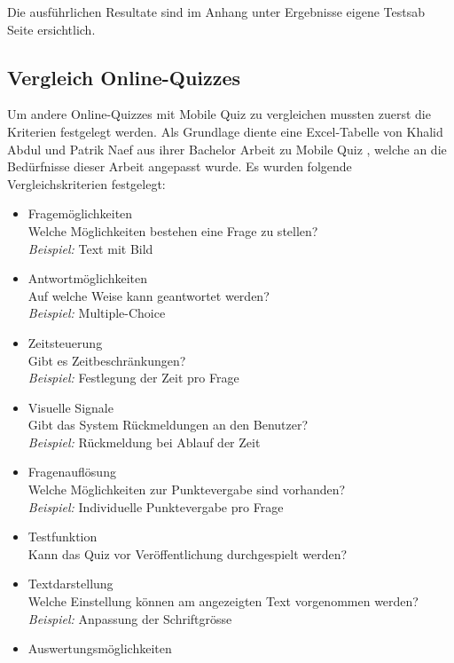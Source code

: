 	Die ausführlichen Resultate sind im Anhang unter \glqq Ergebnisse eigene Tests\grqq ab Seite \hyperlink{page.\getpagerefnumber{pdf:eigeneTests}}{} ersichtlich.	


	\subsection{Vergleich Online-Quizzes}
	\label{subsec:Webuntersuchungen}
	Um andere Online-Quizzes mit Mobile Quiz zu vergleichen mussten zuerst die Kriterien festgelegt werden. Als Grundlage diente eine Excel-Tabelle von Khalid Abdul und Patrik Naef aus ihrer Bachelor Arbeit zu Mobile Quiz \cite{khalid_bachelorarbeit_mobile_quiz_juni_2012.pdf_2012}, welche an die Bedürfnisse dieser Arbeit angepasst wurde. Es wurden folgende Vergleichskriterien festgelegt:
	\begin{itemize}
		\item Fragemöglichkeiten \\
		Welche Möglichkeiten bestehen eine Frage zu stellen? \\
		\textit{Beispiel:} Text mit Bild
		\item Antwortmöglichkeiten \\
		Auf welche Weise kann geantwortet werden? \\
		\textit{Beispiel:} Multiple-Choice
		\item Zeitsteuerung \\
		Gibt es Zeitbeschränkungen? \\
		\textit{Beispiel:} Festlegung der Zeit pro Frage
		\item Visuelle Signale \\
		Gibt das System Rückmeldungen an den Benutzer? \\
		\textit{Beispiel:} Rückmeldung bei Ablauf der Zeit
		\item Fragenauflösung \\
		Welche Möglichkeiten zur Punktevergabe sind vorhanden? \\
		\textit{Beispiel:} Individuelle Punktevergabe pro Frage
		\item Testfunktion \\
		Kann das Quiz vor Veröffentlichung durchgespielt werden?
		\item Textdarstellung \\
		Welche Einstellung können am angezeigten Text vorgenommen werden? \\
		\textit{Beispiel:} Anpassung der  Schriftgrösse
		\item Auswertungsmöglichkeiten \\

\end{itemize}
